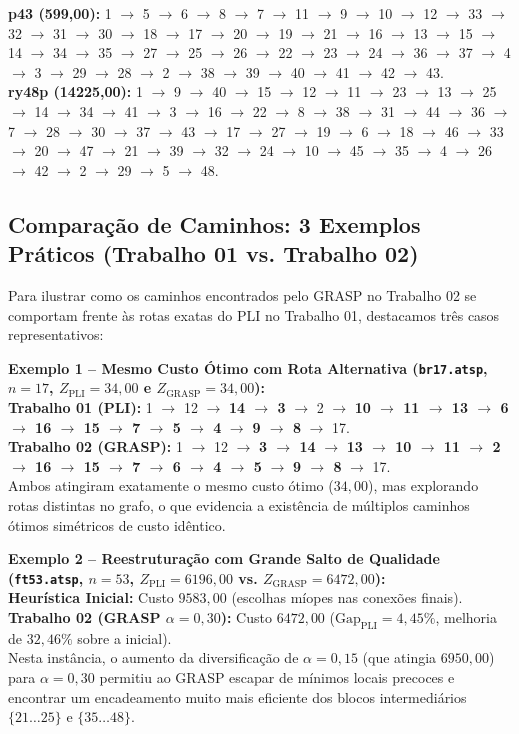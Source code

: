 \documentclass[10pt,a4paper]{article}
\begin{document}
\textbf{p43 (599,00):} 1 $\to$ 5 $\to$ 6 $\to$ 8 $\to$ 7 $\to$ 11 $\to$ 9 $\to$ 10 $\to$ 12 $\to$ 33 $\to$ 32 $\to$ 31 $\to$ 30 $\to$ 18 $\to$ 17 $\to$ 20 $\to$ 19 $\to$ 21 $\to$ 16 $\to$ 13 $\to$ 15 $\to$ 14 $\to$ 34 $\to$ 35 $\to$ 27 $\to$ 25 $\to$ 26 $\to$ 22 $\to$ 23 $\to$ 24 $\to$ 36 $\to$ 37 $\to$ 4 $\to$ 3 $\to$ 29 $\to$ 28 $\to$ 2 $\to$ 38 $\to$ 39 $\to$ 40 $\to$ 41 $\to$ 42 $\to$ 43. \\
\textbf{ry48p (14225,00):} 1 $\to$ 9 $\to$ 40 $\to$ 15 $\to$ 12 $\to$ 11 $\to$ 23 $\to$ 13 $\to$ 25 $\to$ 14 $\to$ 34 $\to$ 41 $\to$ 3 $\to$ 16 $\to$ 22 $\to$ 8 $\to$ 38 $\to$ 31 $\to$ 44 $\to$ 36 $\to$ 7 $\to$ 28 $\to$ 30 $\to$ 37 $\to$ 43 $\to$ 17 $\to$ 27 $\to$ 19 $\to$ 6 $\to$ 18 $\to$ 46 $\to$ 33 $\to$ 20 $\to$ 47 $\to$ 21 $\to$ 39 $\to$ 32 $\to$ 24 $\to$ 10 $\to$ 45 $\to$ 35 $\to$ 4 $\to$ 26 $\to$ 42 $\to$ 2 $\to$ 29 $\to$ 5 $\to$ 48.
\normalsize

\subsection{Comparação de Caminhos: 3 Exemplos Práticos (Trabalho 01 vs. Trabalho 02)}
Para ilustrar como os caminhos encontrados pelo GRASP no Trabalho 02 se comportam frente às rotas exatas do PLI no Trabalho 01, destacamos três casos representativos:

\noindent \textbf{Exemplo 1 -- Mesmo Custo Ótimo com Rota Alternativa (\texttt{br17.atsp}, $n=17$, $Z_{\text{PLI}} = 34,00$ e $Z_{\text{GRASP}} = 34,00$):} \\
\scriptsize
\textbf{Trabalho 01 (PLI):} 1 $\to$ 12 $\to$ \textbf{14 $\to$ 3} $\to$ 2 $\to$ \textbf{10 $\to$ 11 $\to$ 13 $\to$ 6 $\to$ 16 $\to$ 15 $\to$ 7 $\to$ 5 $\to$ 4} $\to$ \textbf{9 $\to$ 8} $\to$ 17. \\
\textbf{Trabalho 02 (GRASP):} 1 $\to$ 12 $\to$ \textbf{3 $\to$ 14} $\to$ \textbf{13 $\to$ 10 $\to$ 11 $\to$ 2 $\to$ 16 $\to$ 15 $\to$ 7 $\to$ 6 $\to$ 4 $\to$ 5} $\to$ \textbf{9 $\to$ 8} $\to$ 17. \\
\normalsize
Ambos atingiram exatamente o mesmo custo ótimo ($34,00$), mas explorando rotas distintas no grafo, o que evidencia a existência de múltiplos caminhos ótimos simétricos de custo idêntico.

\medskip
\noindent \textbf{Exemplo 2 -- Reestruturação com Grande Salto de Qualidade (\texttt{ft53.atsp}, $n=53$, $Z_{\text{PLI}} = 6196,00$ vs. $Z_{\text{GRASP}} = 6472,00$):} \\
\scriptsize
\textbf{Heurística Inicial:} Custo $9583,00$ (escolhas míopes nas conexões finais). \\
\textbf{Trabalho 02 (GRASP $\alpha=0,30$):} Custo $6472,00$ ($\text{Gap}_{\text{PLI}} = 4,45\%$, melhoria de $32,46\%$ sobre a inicial). \\
\normalsize
Nesta instância, o aumento da diversificação de $\alpha = 0,15$ (que atingia $6950,00$) para $\alpha = 0,30$ permitiu ao GRASP escapar de mínimos locais precoces e encontrar um encadeamento muito mais eficiente dos blocos intermediários $\{21 \dots 25\}$ e $\{35 \dots 48\}$.
\end{document}
